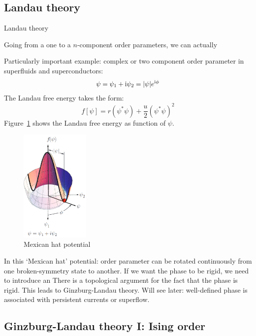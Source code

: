 \documentclass[../main.tex]{subfiles}
\begin{document}
\subsection{Landau theory}


Landau theory

Going from a one to a \(n\)-component order parameters, we can actually

Particularly important example: complex or two component order parameter in superfluids and superconductors:
\begin{equation}
    \psi = \psi_1 + \mathrm{i} \psi_2 = \vert \psi \vert e^{\mathrm{i} \phi}
\end{equation}
The Landau free energy takes the form:
\begin{equation}
    f[\psi] = r(\psi^* \psi) + \frac{u}{2} (\psi^* \psi)^2
\end{equation}
Figure~\ref{fig:Landau free energy mexican hat potential} shows the Landau free energy as function of \(\psi\).

\begin{figure}[t]
    \centering
    \includegraphics[width=0.3\textwidth]{images/landau free energy mexican hat}
    \caption{Mexican hat potential}
    \label{fig:Landau free energy mexican hat potential}
\end{figure}

In this `Mexican hat' potential: order parameter can be rotated continuously from one broken-symmetry state to another.
If we want the phase to be rigid, we need to introduce an
There is a topological argument for the fact that the phase is rigid.
This leads to Ginzburg-Landau theory.
Will see later: well-defined phase is associated with persistent currents or superflow.

\subsection{Ginzburg-Landau theory I: Ising order}
\end{document}
